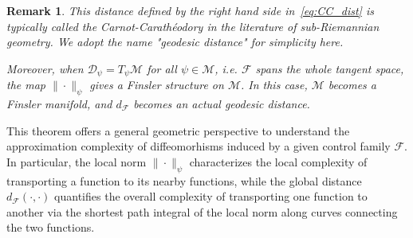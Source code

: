 \documentclass[12pt]{amsart}
\numberwithin{equation}{section}
\newtheorem{remark}{Remark}[section]
\theoremstyle{remark}
\newcommand{\ql}[1]{\texttt{\color{cyan} QL: \footnotesize #1}}
\begin{document}

\begin{remark}
  This distance defined by the right hand side in~\eqref{eq:CC_dist} is typically called the Carnot-Carathéodory in the literature of sub-Riemannian geometry. We adopt the name "geodesic distance" for simplicity here. 

  Moreover, when  $\mathcal D_\psi = T_\psi\mathcal M$ for all $\psi\in \mathcal M$, i.e. $\mathcal F$ spans the whole tangent space, the map $\|\cdot\|_\psi$ gives a Finsler structure on $\mathcal M$. In this case, $\mathcal M$ becomes a Finsler manifold, and $d_{\mathcal F}$ becomes an actual geodesic distance.
\end{remark}



This theorem offers a general geometric perspective to understand the approximation complexity of diffeomorhisms
induced by a given control family $\mathcal F$.
In particular, the local norm $\|\cdot\|_{\psi}$
characterizes the local complexity of transporting a function to its nearby functions, while the global distance $d_{\mathcal F}(\cdot, \cdot)$ quantifies the overall complexity of transporting one function to another via the shortest path integral of the local norm along curves connecting the two functions.
\end{document}
